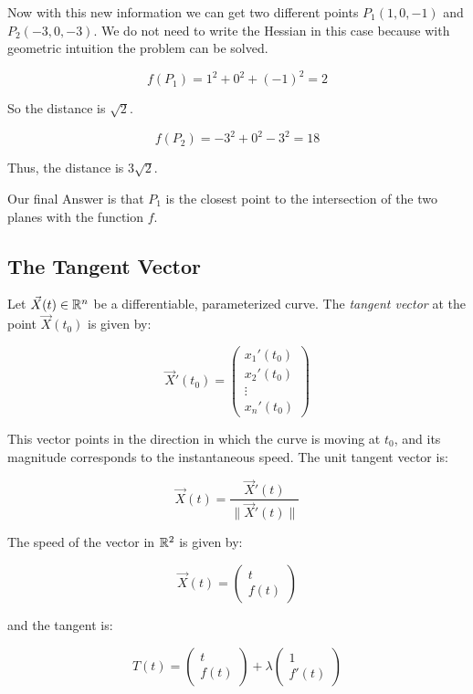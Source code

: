 Now with this new information we can get two different points \(P_1(1, 0, -1)\) and \(P_2(-3, 0, -3)\).
We do not need to write the Hessian in this case because with geometric intuition the problem can be 
solved.

\[
    f(P_1) = 1^2 + 0^2 + (-1)^2 = 2 
\]

So the distance is \(\sqrt{2}\).

\[
    f(P_2) = -3^2 + 0^2 -3^2 = 18
\]

Thus, the distance is \(3\sqrt{2}\).

Our final Answer is that \(P_1\) is the closest point to the intersection of the two planes with the 
function \(f\).

\subsection{The Tangent Vector}

Let \( \vec{X}(t) \in \mathbb{R}^n \) be a differentiable, parameterized curve. The \emph{tangent vector} 
at the point \( \vec{X}(t_0) \) is given by:

\[
    \vec{X}'(t_0) = \begin{pmatrix}
        x_1 ' (t_0) \\ x_2 ' (t_0) \\ \vdots \\ x_n ' (t_0)
    \end{pmatrix}
\]

This vector points in the direction in which the curve is moving at \( t_0 \), and its magnitude 
corresponds to the instantaneous speed. The unit tangent vector is:

\[
    \vec{X}(t) = \frac{\vec{X}'(t)}{\|\vec{X}'(t)\|}
\]

The speed of the vector in \(\mathbb{R}^2\) is given by:

\[
    \vec{X}(t) = \begin{pmatrix}
        t \\ f(t)
    \end{pmatrix}
\]

and the tangent is:

\[
    T(t) = \begin{pmatrix}
        t \\ f(t)
    \end{pmatrix} + \lambda \begin{pmatrix}
        1 \\ f'(t)
    \end{pmatrix}
\]

